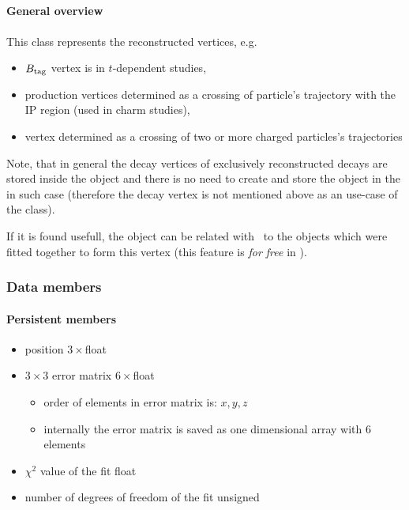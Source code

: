 \newpage
\subsection{\vertex}

\paragraph{General overview} This class represents the reconstructed vertices, e.g.
\begin{itemize}
 \item $B_{\rm tag}$ vertex is in $t$-dependent studies,
 \item production vertices determined as a crossing of particle's trajectory with the IP region (used in charm studies),
 \item vertex determined as a crossing of two or more charged particles's trajectories
\end{itemize}

Note, that in general the decay vertices of exclusively reconstructed decays are stored inside the \particle object and there is
no need to create and store the \vertex object in the \dStore in such case (therefore the decay vertex is not mentioned above as 
an use-case of the \vertex class). 

If it is found usefull, the \vertex object can be related with \basf\ \relation to the \particle objects which were fitted
together to form this vertex (this feature is {\it for free} in \basf).

\subsubsection{Data members}

\paragraph{Persistent members}
\begin{itemize}
 \item {\color{blue}position} \hfill{$3\times$float}
 \item {\color{blue}$3\times3$ error matrix} \hfill{$6\times$float}
 \begin{itemize}
  \item order of elements in error matrix is: $x,y,z$
  \item internally the error matrix is saved as one dimensional array with 6 elements
 \end{itemize}
 \item {\color{blue} $\chi^2$ value of the fit} \hfill{float}
 \item {\color{blue}number of degrees of freedom of the fit} \hfill{unsigned}
\end{itemize}

